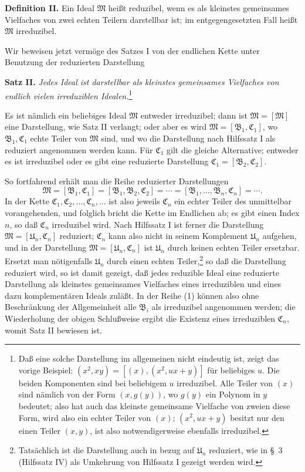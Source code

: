 \documentclass[11pt]{article}
\newcommand{\ideal}[1]{\mathfrak{#1}}
\begin{document}
\textbf{Definition II.} Ein Ideal $\ideal M$ heißt reduzibel, wenn es als kleinstes gemeinsames Vielfaches von zwei echten Teilern darstellbar ist; im entgegengesetzten Fall heißt $\ideal M$ irreduzibel.

Wir beweisen jetzt vermöge des Satzes I von der endlichen Kette unter Benutzung der reduzierten Darstellung

\textbf{Satz II.} \emph{Jedes Ideal ist darstellbar als kleinstes gemeinsames Vielfaches von endlich vielen irreduziblen Idealen.}\footnote{Daß eine solche Darstellung im allgemeinen nicht eindeutig ist, zeigt das vorige Beispiel: $(x^2,xy)=[(x),(x^2,ux+y)]$ für beliebiges $u$. Die beiden Komponenten sind bei beliebigem $u$ irreduzibel. Alle Teiler von $(x)$ sind nämlich von der Form $(x,g(y))$, wo $g(y)$ ein Polynom in $y$ bedeutet; also hat auch das kleinste gemeinsame Vielfache von zweien diese Form, wird also ein echter Teiler von $(x)$; $(x^2,ux+y)$ besitzt nur den einen Teiler $(x,y)$, ist also notwendigerweise ebenfalls irreduzibel.}

Es ist nämlich ein beliebiges Ideal $\ideal M$ entweder irreduzibel; dann ist $\ideal M=[\ideal M]$ eine Darstellung, wie Satz II verlangt; oder aber es wird $\ideal M=[\ideal B_1,\ideal C_1]$, wo $\ideal B_1,\ideal C_1$ echte Teiler von $\ideal M$ sind, und wo die Darstellung nach Hilfssatz I als reduziert angenommen werden kann. Für $\ideal C_1$ gilt die gleiche Alternative; entweder es ist irreduzibel oder es gibt eine reduzierte Darstellung $\ideal C_1=[\ideal B_2,\ideal C_2]$.

So fortfahrend erhält man die Reihe reduzierter Darstellungen
\begin{equation}
 \ideal M=[\ideal B_1,\ideal C_1]=[\ideal B_1,\ideal B_2,\ideal C_2]=\cdots=[\ideal B_1,\ldots,\ideal B_n,\ideal C_n]=\cdots .
\tag{1}
\end{equation}
In der Kette $\ideal C_1,\ideal C_2,\ldots,\ideal C_n,\ldots$ ist also jeweils $\ideal C_n$ ein echter Teiler des unmittelbar vorangehenden, und folglich bricht die Kette im Endlichen ab; es gibt einen Index $n$, so daß $\ideal C_n$ irreduzibel wird. Nach Hilfssatz I ist ferner die Darstellung $\ideal M=[\ideal U_n,\ideal C_n]$ reduziert; $\ideal C_n$ kann also nicht in seinem Komplement $\ideal U_n$ aufgehen, und in der Darstellung $\ideal M=[\ideal U_n,\ideal C_n]$ ist $\ideal U_n$ durch keinen echten Teiler ersetzbar. Ersetzt man nötigenfalls $\ideal U_n$ durch einen echten Teiler,\footnote{Tatsächlich ist die Darstellung auch in bezug auf $\ideal U_n$ reduziert, wie in \S~3 (Hilfssatz IV) als Umkehrung von Hilfssatz I gezeigt werden wird.} so daß die Darstellung reduziert wird, so ist damit gezeigt, daß jedes reduzible Ideal eine reduzierte Darstellung als kleinstes gemeinsames Vielfaches eines irreduziblen und eines dazu komplementären Ideals zuläßt. In der Reihe (1) können also ohne Beschränkung der Allgemeinheit alle $\ideal B_i$ als irreduzibel angenommen werden; die Wiederholung der obigen Schlußweise ergibt die Existenz eines irreduziblen $\ideal C_n$, womit Satz II bewiesen ist.
\end{document}
